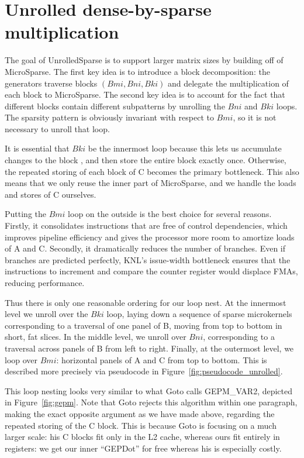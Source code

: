 \section{Unrolled dense-by-sparse multiplication}


The goal of UnrolledSparse is to support larger matrix sizes by building off of MicroSparse. The first key idea is to introduce a block decomposition: the generators traverse blocks $(Bmi, Bni, Bki)$ and delegate the multiplication of each block to MicroSparse. The second key idea is to account for the fact that different blocks contain different subpatterns by unrolling the $Bni$ and $Bki$ loops. The sparsity pattern is obviously invariant with respect to $Bmi$, so it is not necessary to unroll that loop. 

It is essential that $Bki$ be the innermost loop because this lets us accumulate changes to the block , and then store the entire block exactly once. Otherwise, the repeated storing of each block of C becomes the primary bottleneck. This also means that we only reuse the inner part of MicroSparse, and we handle the loads and stores of C ourselves.

Putting the $Bmi$ loop on the outside is the best choice for several reasons. Firstly, it consolidates instructions that are free of control dependencies, which improves pipeline efficiency and gives the processor more room to amortize loads of A and C. Secondly, it dramatically reduces the number of branches. Even if branches are predicted perfectly, KNL's issue-width bottleneck ensures that the instructions to increment and compare the counter register would displace FMAs, reducing performance.

Thus there is only one reasonable ordering for our loop nest. At the innermost level we unroll over the $Bki$ loop, laying down a sequence of sparse microkernels corresponding to a traversal of one panel of B, moving from top to bottom in short, fat slices. In the middle level, we unroll over $Bni$, corresponding to a traversal across panels of B from left to right. Finally, at the outermost level, we loop over $Bmi$: horizontal panels of A and C from top to bottom. This is described more precisely via pseudocode in Figure~\ref{fig:pseudocode_unrolled}.

This loop nesting looks very similar to what Goto calls GEPM\_VAR2, depicted in Figure~\ref{fig:gepm}. Note that Goto rejects this algorithm within one paragraph, making the exact opposite argument as we have made above, regarding the repeated storing of the C block. This is because Goto is focusing on a much larger scale: his C blocks fit only in the L2 cache, whereas ours fit entirely in registers: we get our inner ``GEPDot'' for free whereas his is especially costly.

